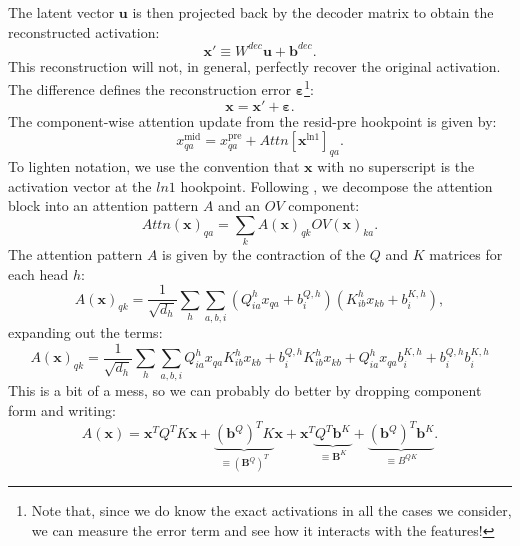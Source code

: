 \documentclass[11pt]{article}
\theoremstyle{definition}
\theoremstyle{plain}
\theoremstyle{remark}
\begin{document}
The latent vector $\mathbf{u}$ is then projected back by the decoder matrix to obtain the reconstructed activation:
\begin{equation}
    \mathbf{x}'\equiv W^{dec}\mathbf{u}+\mathbf{b}^{dec}.
\end{equation}
This reconstruction will not, in general, perfectly recover the original activation. The difference defines the reconstruction error $\boldsymbol{\varepsilon}$\footnote{Note that, since we do know the exact activations in all the cases we consider, we can measure the error term and see how it interacts with the features!}:
\begin{equation}
    \mathbf{x}=\mathbf{x}'+\boldsymbol{\varepsilon}.
\end{equation}
The component-wise attention update from the resid-pre hookpoint is given by:
\begin{equation}
    x^{\textrm{mid}}_{q a}=x^{\textrm{pre}}_{q a}+Attn[\mathbf{x}^{\textrm{ln1}}]_{q a}.
\end{equation}
To lighten notation, we use the convention that $\mathbf{x}$ with no superscript is the activation vector at the $ln1$ hookpoint. Following \cite{elhage_mathematical_framework}, we decompose the attention block into an attention pattern $A$ and an $OV$ component:
\begin{equation}
    Attn(\mathbf{x})_{q a}=\sum_{k}A(\mathbf{x})_{qk}OV(\mathbf{x})_{k a}.
\end{equation}
The attention pattern $A$ is given by the contraction of the $Q$ and $K$ matrices for each head $h$:
\begin{equation}
    A(\mathbf{x})_{qk}=\frac{1}{\sqrt{d_h}}\sum_{h}\sum_{a,b,i}
    \left(
        Q^h_{i a}x_{q a}+b^{Q,h}_{i}
    \right)
    \left(
        K^h_{i b}x_{k b}+b^{K,h}_{i}
    \right),
\end{equation}
expanding out the terms:
\begin{equation}
    A(\mathbf{x})_{qk}=\frac{1}{\sqrt{d_h}}\sum_{h}\sum_{a,b,i}
    Q^h_{i a}x_{q a}K^h_{i b}x_{k b}
    +b^{Q,h}_{i}K^h_{i b}x_{k b}
    +Q^h_{i a}x_{q a}b^{K,h}_{i}
    +b^{Q,h}_{i}b^{K,h}_{i}
\end{equation}
This is a bit of a mess, so we can probably do better by dropping component form and writing:
\begin{equation}
    A(\mathbf{x})=\mathbf{x}^TQ^TK\mathbf{x}+\underbrace{(\mathbf{b}^Q)^TK}_{\equiv (\mathbf{B}^Q)^T}\mathbf{x}+\mathbf{x}^T\underbrace{Q^T\mathbf{b}^K}_{\equiv \mathbf{B}^K}+\underbrace{(\mathbf{b}^Q)^T\mathbf{b}^K}_{\equiv B^{QK}}.
\end{equation}
\end{document}
